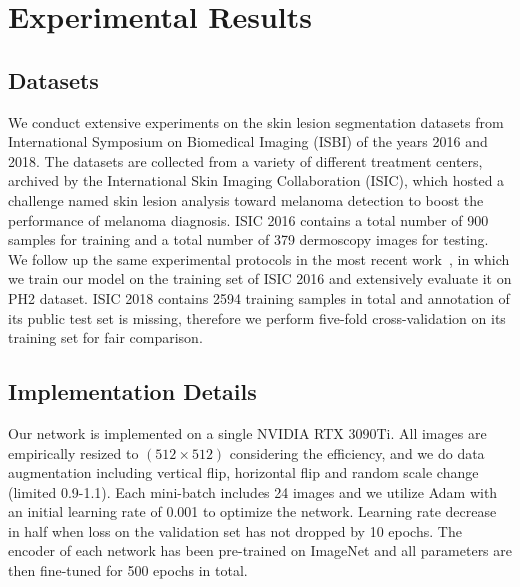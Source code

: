 \documentclass[runningheads]{paper478-llncs}
\begin{document}
\section{Experimental Results}
\subsection{Datasets}
We conduct extensive experiments on the skin lesion segmentation datasets from International Symposium on Biomedical Imaging (ISBI) of the years 2016 and 2018. The datasets are collected from a variety of different treatment centers, archived by the International Skin Imaging Collaboration (ISIC), which hosted a challenge named skin lesion analysis toward melanoma detection to boost the performance of melanoma diagnosis. 
ISIC 2016 contains a total number of 900 samples for training and a total number of 379 dermoscopy images for testing. We follow up the same experimental protocols in the most recent work~\cite{9157193}, in which we train our model on the training set of ISIC 2016 and extensively evaluate it on PH2 dataset.
ISIC 2018 contains 2594 training samples in total and annotation of its public test set is missing, therefore we perform five-fold cross-validation on its training set for fair comparison.

\subsection{Implementation Details}
Our network is implemented on a single NVIDIA RTX 3090Ti. All images are empirically resized to $(512\times512)$ considering the efficiency, and we do data augmentation including vertical flip, horizontal flip and random scale change (limited 0.9-1.1). Each mini-batch includes 24 images and we utilize Adam with an initial learning rate of 0.001 to optimize the network. Learning rate decrease in half when loss on the validation set has not dropped by 10 epochs. The encoder of each network has been pre-trained on ImageNet and all parameters are then fine-tuned for 500 epochs in total.
\end{document}

